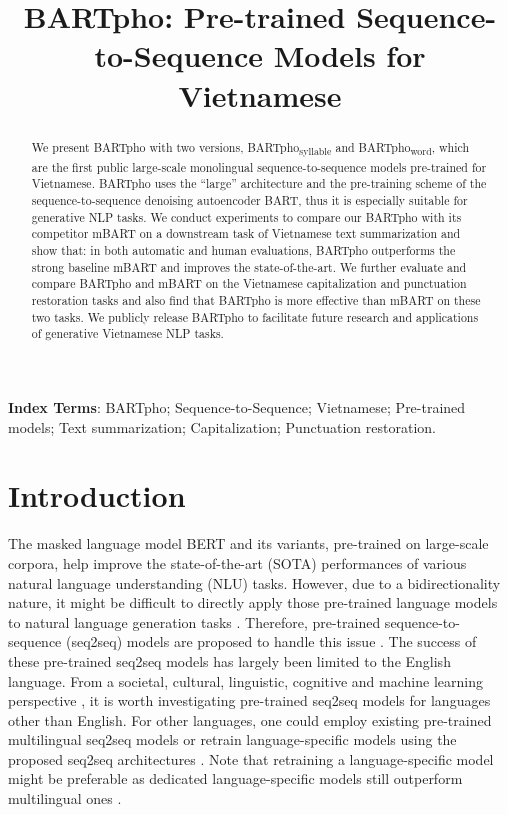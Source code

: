 \documentclass[a4paper]{article}
\title{BARTpho: Pre-trained Sequence-to-Sequence Models for Vietnamese}
\begin{document}
\maketitle

\begin{abstract}
We present BARTpho with two versions, BARTpho\textsubscript{syllable} and BARTpho\textsubscript{word}, which are the first public large-scale monolingual sequence-to-sequence models pre-trained for Vietnamese. BARTpho uses the ``large'' architecture and the pre-training scheme of the sequence-to-sequence denoising autoencoder BART, thus it is especially suitable for generative NLP tasks. We conduct experiments to compare our BARTpho with its competitor mBART on a downstream task of Vietnamese text summarization and show that: in  both  automatic  and  human  evaluations, BARTpho outperforms the strong baseline mBART and improves the state-of-the-art. We further evaluate and compare BARTpho and mBART on the Vietnamese capitalization and punctuation restoration tasks and also find that BARTpho is more effective than mBART on these two tasks. 
We publicly release BARTpho to facilitate future research and applications of generative Vietnamese NLP tasks. 
\end{abstract}



\medskip 
\noindent\textbf{Index Terms}: BARTpho; Sequence-to-Sequence; Vietnamese; Pre-trained models; Text summarization; Capitalization; Punctuation restoration. 

\section{Introduction}

The masked language model BERT \cite{devlin-etal-2019-bert} and its variants, pre-trained on large-scale corpora, help improve the state-of-the-art  (SOTA)  performances of various natural language understanding (NLU) tasks. However, due to a bidirectionality nature, it might be difficult to directly apply those pre-trained language models to natural language generation tasks \cite{wang2019bert}. Therefore, pre-trained sequence-to-sequence (seq2seq) models are proposed to handle this issue \cite{NEURIPS2019_c20bb2d9,lewis-etal-2020-bart,pmlr-v119-zhang20ae,JMLR:v21:20-074,qi-etal-2020-prophetnet,byt5}. The success of these pre-trained seq2seq models has largely been limited to the English language. 
From a societal,  cultural, linguistic, cognitive and machine learning perspective \cite{donlpotherlanguages}, it is worth investigating pre-trained seq2seq models for languages other than English. 
For other languages, one could employ existing pre-trained multilingual seq2seq models \cite{tacl_a_00343,xue-etal-2021-mt5,qi-etal-2021-prophetnet} or retrain  language-specific models using the proposed seq2seq  architectures \cite{eddine2020barthez,bartchinese}. Note that retraining a language-specific model might be preferable as dedicated language-specific models still outperform multilingual ones \cite{nguyen-tuan-nguyen-2020-phobert}. 
\end{document}
